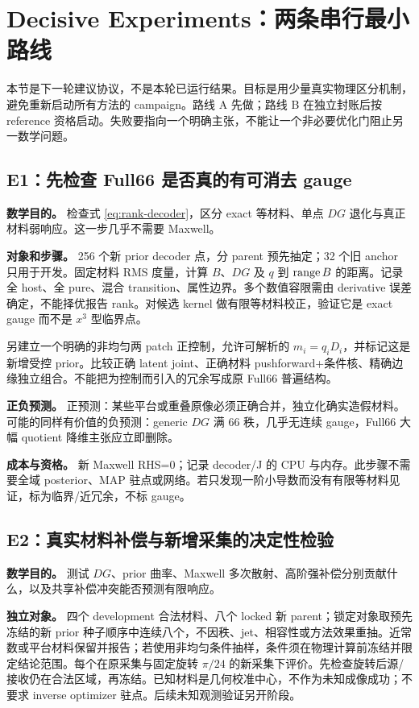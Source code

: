 \section{Decisive Experiments：两条串行最小路线}
\label{sec:experiments}

本节是下一轮建议协议，不是本轮已运行结果。目标是用少量真实物理区分机制，避免重新启动所有方法的 campaign。路线 A 先做；路线 B 在独立封账后按 reference 资格启动。失败要指向一个明确主张，不能让一个非必要优化门阻止另一数学问题。

\subsection{E1：先检查 Full66 是否真的有可消去 gauge}
\textbf{数学目的。} 检查式 \eqref{eq:rank-decoder}，区分 exact 等材料、单点 $DG$ 退化与真正材料弱响应。这一步几乎不需要 Maxwell。

\textbf{对象和步骤。} 256 个新 prior decoder 点，分 parent 预先抽定；32 个旧 anchor 只用于开发。固定材料 RMS 度量，计算 $B$、$DG$ 及 $q$ 到 $\operatorname{range} B$ 的距离。记录全 host、全 pure、混合 transition、属性边界。多个数值容限需由 derivative 误差确定，不能择优报告 rank。对候选 kernel 做有限等材料校正，验证它是 exact gauge 而不是 $x^3$ 型临界点。

另建立一个明确的非均匀两 patch 正控制，允许可解析的 $m_i=q_iD_i$，并标记这是新增受控 prior。比较正确 latent joint、正确材料 pushforward+条件核、精确边缘独立组合。不能把为控制而引入的冗余写成原 Full66 普遍结构。

\textbf{正负预测。} 正预测：某些平台或重叠原像必须正确合并，独立化确实造假材料。可能的同样有价值的负预测：generic $DG$ 满 66 秩，几乎无连续 gauge，Full66 大幅 quotient 降维主张应立即删除。

\textbf{成本与资格。} 新 Maxwell RHS=0；记录 decoder/J 的 CPU 与内存。此步骤不需要全域 posterior、MAP 驻点或网络。若只发现一阶小导数而没有有限等材料见证，标为临界/近冗余，不标 gauge。

\subsection{E2：真实材料补偿与新增采集的决定性检验}
\textbf{数学目的。} 测试 $DG$、prior 曲率、Maxwell 多次散射、高阶强补偿分别贡献什么，以及共享补偿冲突能否预测有限响应。

\textbf{独立对象。} 四个 development 合法材料、八个 locked 新 parent；锁定对象取预先冻结的新 prior 种子顺序中连续八个，不因秩、jet、相容性或方法效果重抽。近常数或平台材料保留并报告；若使用非均匀条件抽样，条件须在物理计算前冻结并限定结论范围。每个在原采集与固定旋转 $\pi/24$ 的新采集下评价。先检查旋转后源/接收仍在合法区域，再冻结。已知材料是几何校准中心，不作为未知成像成功；不要求 inverse optimizer 驻点。后续未知观测验证另开阶段。

